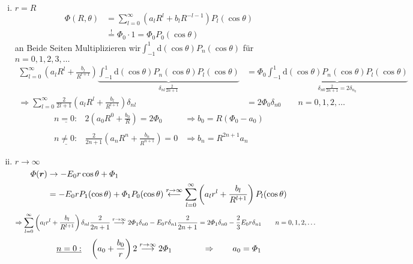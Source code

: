 \documentclass[titlepage,11pt,a4paper,ngerman]{report}
\newcommand{\tx}[1]{\textrm{#1}}
\newcommand{\ub}[1]{\underbrace{#1}}
\newcommand{\dd}{\tx{d}}
\newcommand{\pofr}{\Phi(\vec{r})}
\renewcommand{\Phi}{\varPhi}
\newcommand{\summ}[2]{\sum_{#1}^{#2}}
\renewcommand{\vec}[1]{\boldsymbol{#1}}
\begin{document}
\begin{enumerate}[i)]
	\item $ r = R $
	\begin{align*}
	\Phi(R,\theta) &= \sum_{l=0}^{\infty} \left(a_l R^l + b_l R^{-l-1}\right) P_l(\cos\theta)\\
	&\overset{!}{=} \Phi_0 \cdot 1 = \Phi_0 P_0(\cos\theta) 
	\end{align*}
	an Beide Seiten Multiplizieren wir$ \int_{-1}^{1} \dd (\cos \theta) P_n (\cos\theta) $ für $ n = 0,1,2,3,\dots $
	\begin{align*}
	\sum_{l=0}^{\infty} \left(a_l R^l + \frac{b_l}{R^{l+1}}\right) \ub{\int_{-1}^{1} \dd (\cos\theta) P_n(\cos\theta) P_l(\cos\theta)}_{\delta_{nl} \frac{2}{2n+1}} &= \Phi_0 \ub{\int_{-1}^{1} \dd (\cos\theta) P_n(\cos\theta) P_l(\cos\theta)}_{\delta_{n0} \frac{2}{2n+1} = 2 \delta_{n_0}}\\
	\Rightarrow \summ{l = 0}{\infty} \frac{2}{2l + 1}\left(a_l R^l + \frac{b_l}{R^{l+1}}\right) \delta_{nl} &= 2 \Phi_0 \delta_{n0} \qquad n = 0, 1, 2,\dots
	\end{align*}
	$$\begin{array}{lcl}
		\underline{n = 0:} & 2\left(a_0 R^0 + \displaystyle\frac{b_0}{R}\right) = 2 \Phi_0 &\Rightarrow b_0 = R(\Phi_0 - a_0)\\
		&&\\
		\underline{n \neq 0:} & \displaystyle\frac{2}{2n+1}\left(a_n R^n + \frac{b_n}{R^{n+1}}\right) = 0 &\Rightarrow b_n = R^{2n+1}a_n
	\end{array}$$
	\item $ r \to \infty $
	\begin{align*}
	\pofr &\rightarrow -E_0 r \cos\theta + \Phi_1\\
	&= - E_0 r P_1(\cos\theta) + \Phi_1 P_0(\cos\theta) \buildrel r \to \infty \over \longleftarrow \sum_{l=0}^{\infty} \left(a_l r^l + \frac{b_l}{R^{l+1}}\right) P_l(\cos\theta)
	\end{align*}
	\begin{equation*}
	\Rightarrow \sum_{l=0}^{\infty} \left(a_l r^l + \frac{b_l}{R^{l+1}}\right) \delta_{nl} \frac{2}{2n+1} \buildrel r \to \infty \over \longrightarrow 2 \Phi_1 \delta_{n0} - E_0 r \delta_{n1} \frac{2}{2n+1} = 2 \Phi_1 \delta_{n0} - \frac{2}{3} E_0 r \delta_{n1} \qquad n = 0,1,2,\dots
	\end{equation*}
	\begin{align*}
	&\underline{n = 0:} \quad \left(a_0 + \frac{b_0}{r}\right) 2 \buildrel r \to \infty \over \longrightarrow 2 \Phi_1 \qquad \quad \ \ \Rightarrow \qquad a_0 = \Phi_1\\

\end{align*}
\end{enumerate}
\end{document}
